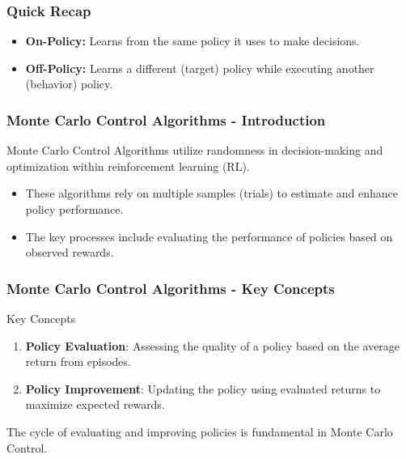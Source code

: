 \documentclass[aspectratio=169]{beamer}
\begin{document}
\begin{frame}[fragile]
  \frametitle{Quick Recap}
  \begin{itemize}
    \item \textbf{On-Policy:} Learns from the same policy it uses to make decisions.
    \item \textbf{Off-Policy:} Learns a different (target) policy while executing another (behavior) policy.
  \end{itemize}
\end{frame}

\begin{frame}[fragile]
    \frametitle{Monte Carlo Control Algorithms - Introduction}
    Monte Carlo Control Algorithms utilize randomness in decision-making and optimization within reinforcement learning (RL). 
    \begin{itemize}
        \item These algorithms rely on multiple samples (trials) to estimate and enhance policy performance.
        \item The key processes include evaluating the performance of policies based on observed rewards.
    \end{itemize}
\end{frame}

\begin{frame}[fragile]
    \frametitle{Monte Carlo Control Algorithms - Key Concepts}
    \begin{block}{Key Concepts}
        \begin{enumerate}
            \item \textbf{Policy Evaluation}: Assessing the quality of a policy based on the average return from episodes.
            \item \textbf{Policy Improvement}: Updating the policy using evaluated returns to maximize expected rewards.
        \end{enumerate}
    \end{block}
    \smallskip
    The cycle of evaluating and improving policies is fundamental in Monte Carlo Control.
\end{frame}
\end{document}
